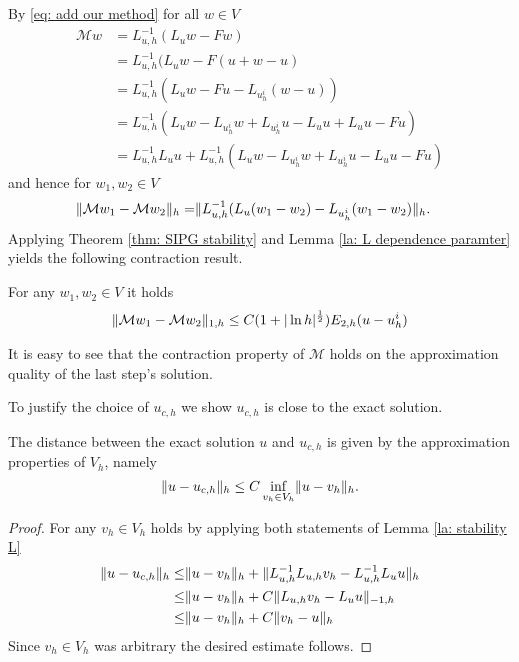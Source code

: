 By \eqref{eq: add our method} for all $w \in V$
\begin{align}
	\mathcal M w &= L_{u,h}^{-1}(L_u w - Fw) \nonumber\\
				 &= L_{u,h}^{-1}(L_u w - F(u+w-u) \nonumber\\
				 &= L_{u,h}^{-1}(L_u w - Fu - L_{u^i_h} (w-u)) \nonumber\\
				 &=  L_{u,h}^{-1}(L_u w - L_{u^i_h} w + L_{u^i_h}u - L_u u + L_u u - Fu) \nonumber\\
				 & = L_{u,h}^{-1} L_u u + L_{u,h}^{-1}(L_u w - L_{u^i_h} w + L_{u^i_h}u - L_u u - Fu) \label{eq: expand M}
 \end{align}
and hence for $w_1, w_2 \in V$
\begin{align*}
	\lVert \mathcal M w_1 - \mathcal M w_2 \rVert_{h} =& \lVert L_{u,h}^{-1}(L_u (w_1-w_2) - L_{u^i_h} (w_1-w_2) \rVert_{h}.
\end{align*}
Applying Theorem \ref{thm: SIPG stability} and Lemma \ref{la: L dependence paramter} yields the following contraction result.
\begin{lemma} \label{la: contraction property M}
	For any $w_1, w_2 \in V$ it holds
\begin{align*}
	\lVert \mathcal M w_1 - \mathcal M w_2 \rVert_{1,h}	\leq C (1+|\ln h|^{\frac 1 2})E_{2,h}(u - u^i_h) \label{eq: estimate M}
\end{align*}
\end{lemma}
It is easy to see that the contraction property of $\mathcal{M}$ holds on the approximation quality of the last step's solution. %

To justify the choice of $u_{c,h}$ we show $u_{c,h}$ is close to the exact \MA solution.

\begin{lemma}\label{la: difference u uch}
	The distance between the exact solution $u$ and $u_{c,h}$ is given by the approximation properties of $V_h$, namely
	\[
		\lVert u-u_{c,h} \rVert_{h} \leq C \inf_{v_h \in V_h} \lVert u-v_h \rVert_{h}.
	\]
\end{lemma}
\begin{proof}
	For any $v_h \in V_h$ holds by applying both statements of Lemma \ref{la: stability L}
	\begin{align}
		\lVert u-u_{c,h} \rVert_{h} \leq& \lVert u- v_h \rVert_{h} + \lVert L_{u,h}^{-1}L_{u,h} v_h- L_{u,h}^{-1}L_u u \rVert_{h} \nonumber \\
						  \leq& \lVert u- v_h \rVert_{h} + C \lVert L_{u,h} v_h-  L_u u \rVert_{-1,h} \nonumber \\
						  \leq& \lVert u- v_h \rVert_{h} + C \lVert v_h -u \rVert_{h} \nonumber
	\end{align}
	Since $v_h \in V_h$ was arbitrary the desired estimate follows.
\end{proof}

